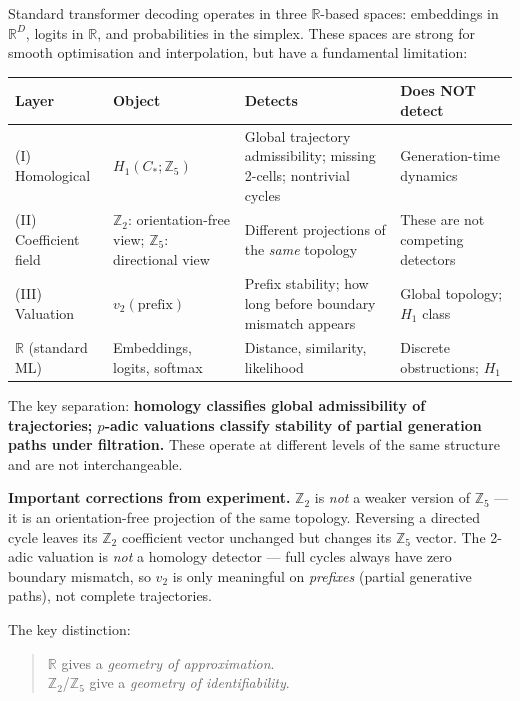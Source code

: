\documentclass[11pt,a4paper]{article}
\begin{document}
Standard transformer decoding operates in three $\mathbb{R}$-based spaces:
embeddings in $\mathbb{R}^D$, logits in $\mathbb{R}$,
and probabilities in the simplex.
These spaces are strong for smooth optimisation and interpolation,
but have a fundamental limitation:

\begin{center}
\renewcommand{\arraystretch}{1.3}\small
\begin{tabular}{p{2.8cm}p{3.5cm}p{3.5cm}p{2.5cm}}
\toprule
\textbf{Layer} & \textbf{Object} & \textbf{Detects} & \textbf{Does NOT detect} \\
\midrule
(I) Homological &
  $H_1(C_*;\mathbb{Z}_5)$ &
  Global trajectory admissibility;
  missing 2-cells; nontrivial cycles &
  Generation-time dynamics \\
(II) Coefficient field &
  $\mathbb{Z}_2$: orientation-free view;
  $\mathbb{Z}_5$: directional view &
  Different projections of the
  \emph{same} topology &
  These are not competing detectors \\
(III) Valuation &
  $v_2(\text{prefix})$ &
  Prefix stability; how long before
  boundary mismatch appears &
  Global topology; $H_1$ class \\
\midrule
$\mathbb{R}$ (standard ML) &
  Embeddings, logits, softmax &
  Distance, similarity, likelihood &
  Discrete obstructions; $H_1$ \\
\bottomrule
\end{tabular}
\end{center}

\noindent
The key separation: \textbf{homology classifies global admissibility
of trajectories; $p$-adic valuations classify stability of partial
generation paths under filtration.}
These operate at different levels of the same structure and are not
interchangeable.

\medskip
\noindent
\textbf{Important corrections from experiment.}
$\mathbb{Z}_2$ is \emph{not} a weaker version of $\mathbb{Z}_5$ ---
it is an orientation-free projection of the same topology.
Reversing a directed cycle leaves its $\mathbb{Z}_2$ coefficient
vector unchanged but changes its $\mathbb{Z}_5$ vector.
The 2-adic valuation is \emph{not} a homology detector --- full cycles
always have zero boundary mismatch, so $v_2$ is only meaningful
on \emph{prefixes} (partial generative paths), not complete trajectories.

The key distinction:
\begin{quote}
$\mathbb{R}$ gives a \emph{geometry of approximation}.\\
$\mathbb{Z}_2$/$\mathbb{Z}_5$ give a \emph{geometry of identifiability}.
\end{quote}
\end{document}
